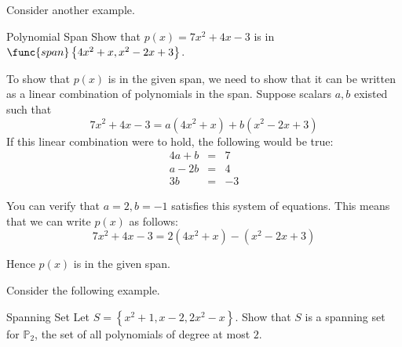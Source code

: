 Consider another example. 

\begin{example}{Polynomial Span}\label{exa:polyspan}
Show that $p(x) = 7x^2 + 4x - 3$ is in $\func{span}\left\{ 4x^2 + x, x^2 -2x + 3 \right\}$. 
\end{example}

\begin{solution}
To show that $p(x)$ is in the given span, we need to show that it can be written as a linear combination of polynomials in the span. Suppose scalars $a, b$ existed such that 
\[
7x^2 +4x - 3= a(4x^2+x) + b (x^2-2x+3) 
\]
If this linear combination were to hold, the following would be true:
\begin{eqnarray*}
4a + b &=& 7 \\
a - 2b &=& 4 \\
3b &=& -3 
\end{eqnarray*}

You can verify that $a = 2, b = -1$ satisfies this system of equations. This means that we can write $p(x)$ as follows:
\[
 7x^2 +4x-3= 2(4x^2+x)  - (x^2-2x+3) 
\]

Hence $p(x)$ is in the given span.
\end{solution}

Consider the following example.

\begin{example}{Spanning Set}\label{exa:spanningset}
Let $S = \left\{ x^2 + 1, x-2, 2x^2 - x \right\}$. Show that $S$ is a spanning set for $\mathbb{P}_2$, the set of all polynomials of degree at most $2$. 
\end{example}

